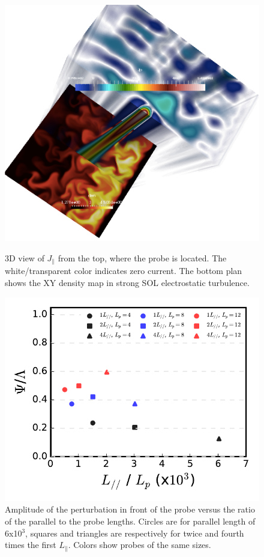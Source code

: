 \documentclass[cpp,a4paper,fleqn,twoside%
]{w-art}
\begin{document}
\begin{figure}
\begin{minipage}{68mm}
\includegraphics[width=\linewidth]{figures/3Dcurrent.pdf} \caption{3D view
of $J_\parallel$ from the top, where the probe is located. The white/transparent
color indicates zero current. The bottom plan shows the XY density map in strong
SOL electrostatic turbulence.}
\label{fig:2}
\end{minipage}
\hfill
\begin{minipage}{68mm}\vspace{20pt}
\includegraphics[width=\linewidth]{figures/perturbAmplLp.pdf}
\caption{Amplitude of the perturbation in front of the probe versus the ratio of the parallel 
to the probe lengths. Circles are for parallel length of 6x10$^3$, squares and triangles
are respectively for twice and fourth times the first $L_\parallel$. Colors show probes of the same sizes.}
\label{fig:3}

\end{minipage}
\end{figure}
\end{document}
